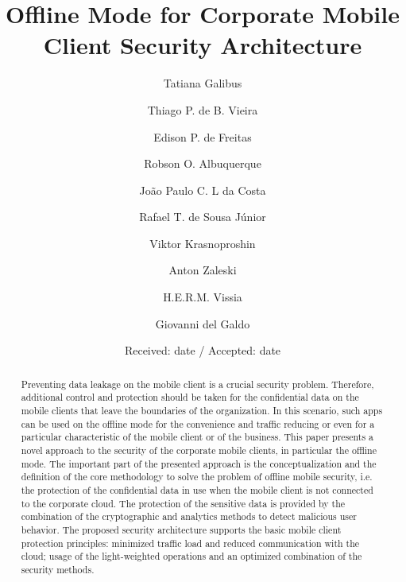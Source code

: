 \documentclass[twocolumn]{svjour3}          	%
\begin{document}
\title{Offline Mode for Corporate Mobile Client Security Architecture}

\author{Tatiana Galibus				\and
        Thiago P. de B. Vieira		\and
        	Edison P. de Freitas			\and
        	Robson O. Albuquerque		\and
        	João Paulo C. L da Costa		\and
        	Rafael T. de Sousa Júnior	\and
        Viktor Krasnoproshin			\and
        	Anton Zaleski				\and
        	H.E.R.M. Vissia				\and
        	Giovanni del Galdo
}


\date{Received: date / Accepted: date}

\maketitle

\begin{abstract}
Preventing data leakage on the mobile client is a crucial security problem. Therefore, additional control and protection should be taken for the confidential data on the mobile clients that leave the boundaries of the organization. In this scenario, such apps can be used on the offline mode for the convenience and traffic reducing or even for a particular characteristic of the mobile client or of the business. This paper presents a novel approach to the security of the corporate mobile clients, in particular the offline mode. The important part of the presented approach is the conceptualization and the definition of the core methodology to solve the problem of offline mobile security, i.e. the protection of the confidential data in use when the mobile client is not connected to the corporate cloud. The protection of the sensitive data is provided by the combination of the cryptographic and analytics methods to detect malicious user behavior. The proposed security architecture supports the basic mobile client protection principles: minimized traffic load and reduced communication with the cloud; usage of the light-weighted operations and an optimized combination of the security methods.
\end{abstract}
\end{document}
